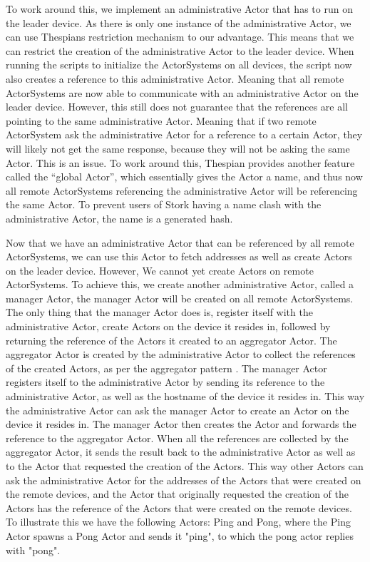 \documentclass[a4paper]{article}
\begin{document}
To work around this, we implement an administrative Actor that has to run on the leader device. As there is only one instance of the administrative Actor, we can use Thespians restriction mechanism to our advantage. This means that we can restrict the creation of the administrative Actor to the leader device. When running the scripts to initialize the ActorSystems on all devices, the script now also creates a reference to this administrative Actor. Meaning that all remote ActorSystems are now able to communicate with an administrative Actor on the leader device. However, this still does not guarantee that the references are all pointing to the same administrative Actor. Meaning that if two remote ActorSystem ask the administrative Actor for a reference to a certain Actor, they will likely not get the same response, because they will not be asking the same Actor. This is an issue. To work around this, Thespian provides another feature called the \enquote{global Actor}, which essentially gives the Actor a name, and thus now all remote ActorSystems referencing the administrative Actor will be referencing the same Actor. To prevent users of Stork having a name clash with the administrative Actor, the name is a generated hash.

Now that we have an administrative Actor that can be referenced by all remote ActorSystems, we can use this Actor to fetch addresses as well as create Actors on the leader device. However, We cannot yet create Actors on remote ActorSystems. To achieve this, we create another administrative Actor, called a manager Actor, the manager Actor will be created on all remote ActorSystems. The only thing that the manager Actor does is, register itself with the administrative Actor, create Actors on the device it resides in, followed by returning the reference of the Actors it created to an aggregator Actor. The aggregator Actor is created by the administrative Actor to collect the references of the created Actors, as per the aggregator pattern \cite{aggregatorpattern}. The manager Actor registers itself to the administrative Actor by sending its reference to the administrative Actor, as well as the hostname of the device it resides in. This way the administrative Actor can ask the manager Actor to create an Actor on the device it resides in. The manager Actor then creates the Actor and forwards the reference to the aggregator Actor. When all the references are collected by the aggregator Actor, it sends the result back to the administrative Actor as well as to the Actor that requested the creation of the Actors. This way other Actors can ask the administrative Actor for the addresses of the Actors that were created on the remote devices, and the Actor that originally requested the creation of the Actors has the reference of the Actors that were created on the remote devices. To illustrate this we have the following Actors: Ping and Pong, where the Ping Actor spawns a Pong Actor and sends it "ping", to which the pong actor replies with "pong".
\end{document}

